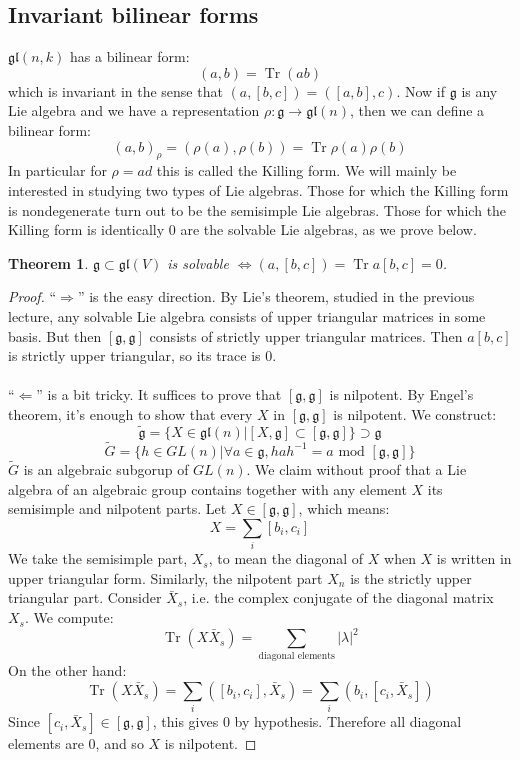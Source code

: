 \documentclass[12 pt]{article}
\DeclareMathOperator {\Tr} {Tr}
\theoremstyle{plain}
\newtheorem*{thm*}{Theorem}
\theoremstyle{definition}
\theoremstyle{remark}
\begin{document}
\subsection*{Invariant bilinear forms}
$\mathfrak{gl}(n,k)$ has a bilinear form:
\[     (a, b) = \Tr(ab)    \]
which is invariant in the sense that $(a, [b,c]) = ([a,b], c)$. Now if $\mathfrak{g}$ is any Lie algebra and we have a representation $\rho : \mathfrak{g} \to \mathfrak{gl}(n)$, then we can define a bilinear form:
\[      (a,b)_{\rho} = (\rho(a), \rho(b)) = \Tr \rho(a) \rho(b)    \]
In particular for $\rho = ad$ this is called the Killing form. We will mainly be interested in studying two types of Lie algebras. Those for which the Killing form is nondegenerate turn out to be the semisimple Lie algebras. Those for which the Killing form is identically 0 are the solvable Lie algebras, as we prove below.
\begin{thm*}
$\mathfrak{g} \subset \mathfrak{gl}(V)$ is solvable $\Leftrightarrow (a, [b,c]) = \Tr a [b,c] = 0$.
\end{thm*}
\begin{proof}
``$\Rightarrow$'' is the easy direction. By Lie's theorem, studied in the previous lecture, any solvable Lie algebra consists of upper triangular matrices in some basis. But then $[\mathfrak{g}, \mathfrak{g}]$ consists of strictly upper triangular matrices. Then $a[b,c]$ is strictly upper triangular, so its trace is 0.
\\
\\
``$\Leftarrow$'' is a bit tricky. It suffices to prove that $[\mathfrak{g},\mathfrak{g}]$ is nilpotent. By Engel's theorem, it's enough to show that every $X$ in $[\mathfrak{g}, \mathfrak{g}]$ is nilpotent. We construct:
\[       \tilde{\mathfrak{g}} = \{ X \in \mathfrak{gl}(n) | [X, \mathfrak{g}] \subset [\mathfrak{g}, \mathfrak{g}] \}  \supset \mathfrak{g}     \]
\[         \tilde G = \{ h \in GL(n) | \forall a \in \mathfrak{g} , hah^{-1} = a \text{ mod } [\mathfrak{g}, \mathfrak{g}]  \}     \]
$\tilde G$ is an algebraic subgorup of $GL(n)$. We claim without proof that a Lie algebra of an algebraic group contains together with any element $X$ its semisimple and nilpotent parts. Let $X \in [\mathfrak{g}, \mathfrak{g}]$, which means:
\[     X = \sum_i [b_i , c_i]     \]
We take the semisimple part, $X_s$, to mean the diagonal of $X$ when $X$ is written in upper triangular form. Similarly, the nilpotent part $X_n$ is the strictly upper triangular part. Consider $\bar X_s$, i.e. the complex conjugate of the diagonal matrix $X_s$. We compute:
\[            \Tr( X \bar X_s)  = \sum_{\text{diagonal elements}} |\lambda|^2       \]
On the other hand:
\[            \Tr( X \bar X_s)  = \sum_i ([b_i, c_i] , \bar X_s) = \sum_i (b_i, [c_i , \bar X_s])       \]
Since $[c_i , \bar X_s] \in [\mathfrak{g} , \mathfrak{g} ]$, this gives 0 by hypothesis. Therefore all diagonal elements are 0, and so $X$ is nilpotent.
\end{proof}
\end{document}
